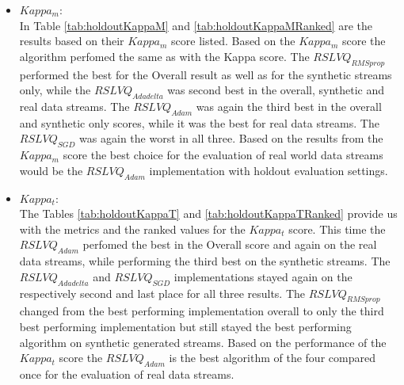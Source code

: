 \documentclass[12pt,oneside,a4paper,parskip]{scrbook}
\begin{document}
\begin{itemize}
  \item \textbf{$Kappa_m$}: \\
        In Table \ref{tab:holdoutKappaM} and \ref{tab:holdoutKappaMRanked} are the results based on their $Kappa_m$ score listed.
        Based on the $Kappa_m$ score the algorithm perfomed the same as with the Kappa score. The $RSLVQ_\textit{RMSprop}$ performed the best 
        for the Overall result as well as for the synthetic streams only, while the $RSLVQ_\textit{Adadelta}$ was second best in the
        overall, synthetic and real data streams. The $RSLVQ_\textit{Adam}$ was again the third best in the overall and synthetic only scores,
        while it was the best for real data streams.
        The $RSLVQ_\textit{SGD}$ was again the worst in all three.
        Based on the results from the $Kappa_m$ score the best choice for the evaluation of real world data streams would be the $RSLVQ_\textit{Adam}$
        implementation with holdout evaluation settings.

  \item \textbf{$Kappa_t$}: \\
        The Tables \ref{tab:holdoutKappaT} and \ref{tab:holdoutKappaTRanked} provide us with the metrics and the ranked values for the $Kappa_t$ score.
        This time the $RSLVQ_\textit{Adam}$ perfomed the best in the Overall score and again on the real data streams, while performing the third best on
        the synthetic streams. The $RSLVQ_\textit{Adadelta}$ and $RSLVQ_\textit{SGD}$ implementations stayed again on the respectively second and last place for 
        all three results. The $RSLVQ_\textit{RMSprop}$ changed from the best performing implementation overall to only the third best performing implementation
        but still stayed the best performing algorithm on synthetic generated streams.
        Based on the performance of the $Kappa_t$ score the $RSLVQ_\textit{Adam}$ is the best algorithm of the four compared once for
        the evaluation of real data streams.


\end{itemize}
\end{document}

